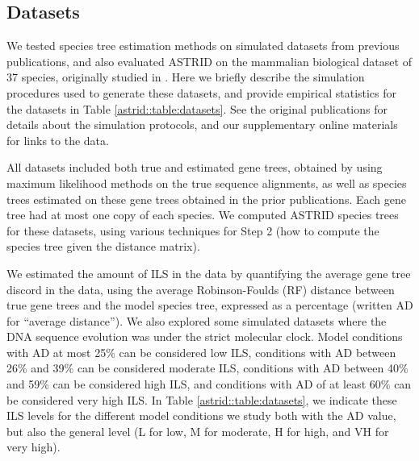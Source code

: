 \subsection{Datasets}
We tested species tree estimation methods on 
simulated datasets from previous publications, and also evaluated
ASTRID on the mammalian biological dataset of 37 species,
originally studied in \cite{statbinning}.
Here we briefly describe the simulation procedures used to
generate these datasets, and provide empirical
statistics for the datasets 
in Table \ref{astrid::table:datasets}.
See the original publications for details about the simulation protocols,
and our supplementary online materials for links to the data.

All datasets
included both true and estimated gene trees, obtained by using maximum likelihood
methods on the true sequence alignments, as well as 
species trees estimated on these gene trees obtained in the
prior publications. 
Each gene tree had at most one copy of each species. 
We computed ASTRID 
species trees for these datasets, using various techniques for
Step 2 (how to compute the species tree given the distance matrix).

We estimated the amount of ILS in the data by quantifying the
average gene tree discord in the data, using the
average Robinson-Foulds (RF) \cite{RF} distance 
between true gene trees and the model species tree,
expressed as a percentage (written AD for ``average distance'').
We also explored some simulated datasets where the DNA sequence
evolution was under the strict molecular clock.
Model conditions with AD at most 25\% can be considered low ILS,
conditions with AD between 26\% and 39\% can be considered moderate ILS,
conditions with AD between 40\% and 59\% can be considered high ILS, and
conditions with AD of at least 60\% can be considered very high ILS. 
In Table \ref{astrid::table:datasets}, we indicate these  ILS levels for the different
model conditions we study both with the AD value, but also the general level (L for low,
M for moderate, H for high, and VH for very high).

